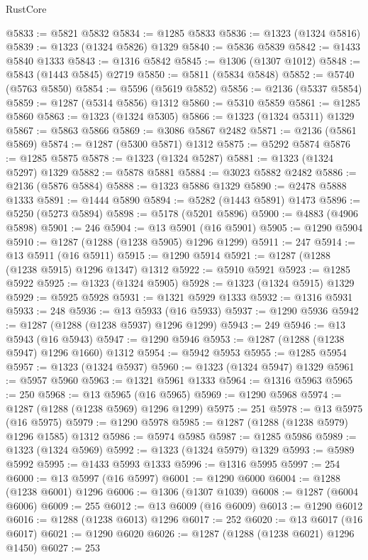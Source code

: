 \begin{lexlean}{RustCore}
\begin{coremodule}
@5833 := @5821 @5832
@5834 := @1285 @5833
@5836 := @1323 (@1324 @5816)
@5839 := @1323 (@1324 @5826) @1329
@5840 := @5836 @5839
@5842 := @1433 @5840 @1333
@5843 := @1316 @5842
@5845 := @1306 (@1307 @1012)
@5848 := @5843 (@1443 @5845) @2719
@5850 := @5811 (@5834 @5848)
@5852 := @5740 (@5763 @5850)
@5854 := @5596 (@5619 @5852)
@5856 := @2136 (@5337 @5854)
@5859 := @1287 (@5314 @5856) @1312
@5860 := @5310 @5859
@5861 := @1285 @5860
@5863 := @1323 (@1324 @5305)
@5866 := @1323 (@1324 @5311) @1329
@5867 := @5863 @5866
@5869 := @3086 @5867 @2482
@5871 := @2136 (@5861 @5869)
@5874 := @1287 (@5300 @5871) @1312
@5875 := @5292 @5874
@5876 := @1285 @5875
@5878 := @1323 (@1324 @5287)
@5881 := @1323 (@1324 @5297) @1329
@5882 := @5878 @5881
@5884 := @3023 @5882 @2482
@5886 := @2136 (@5876 @5884)
@5888 := @1323 @5886 @1329
@5890 := @2478 @5888 @1333
@5891 := @1444 @5890
@5894 := @5282 (@1443 @5891) @1473
@5896 := @5250 (@5273 @5894)
@5898 := @5178 (@5201 @5896)
@5900 := @4883 (@4906 @5898)
@5901 := 246
@5904 := @13 @5901 (@16 @5901)
@5905 := @1290 @5904
@5910 := @1287 (@1288 (@1238 @5905) @1296 @1299)
@5911 := 247
@5914 := @13 @5911 (@16 @5911)
@5915 := @1290 @5914
@5921 := @1287 (@1288 (@1238 @5915) @1296 @1347) @1312
@5922 := @5910 @5921
@5923 := @1285 @5922
@5925 := @1323 (@1324 @5905)
@5928 := @1323 (@1324 @5915) @1329
@5929 := @5925 @5928
@5931 := @1321 @5929 @1333
@5932 := @1316 @5931
@5933 := 248
@5936 := @13 @5933 (@16 @5933)
@5937 := @1290 @5936
@5942 := @1287 (@1288 (@1238 @5937) @1296 @1299)
@5943 := 249
@5946 := @13 @5943 (@16 @5943)
@5947 := @1290 @5946
@5953 := @1287 (@1288 (@1238 @5947) @1296 @1660) @1312
@5954 := @5942 @5953
@5955 := @1285 @5954
@5957 := @1323 (@1324 @5937)
@5960 := @1323 (@1324 @5947) @1329
@5961 := @5957 @5960
@5963 := @1321 @5961 @1333
@5964 := @1316 @5963
@5965 := 250
@5968 := @13 @5965 (@16 @5965)
@5969 := @1290 @5968
@5974 := @1287 (@1288 (@1238 @5969) @1296 @1299)
@5975 := 251
@5978 := @13 @5975 (@16 @5975)
@5979 := @1290 @5978
@5985 := @1287 (@1288 (@1238 @5979) @1296 @1585) @1312
@5986 := @5974 @5985
@5987 := @1285 @5986
@5989 := @1323 (@1324 @5969)
@5992 := @1323 (@1324 @5979) @1329
@5993 := @5989 @5992
@5995 := @1433 @5993 @1333
@5996 := @1316 @5995
@5997 := 254
@6000 := @13 @5997 (@16 @5997)
@6001 := @1290 @6000
@6004 := @1288 (@1238 @6001) @1296
@6006 := @1306 (@1307 @1039)
@6008 := @1287 (@6004 @6006)
@6009 := 255
@6012 := @13 @6009 (@16 @6009)
@6013 := @1290 @6012
@6016 := @1288 (@1238 @6013) @1296
@6017 := 252
@6020 := @13 @6017 (@16 @6017)
@6021 := @1290 @6020
@6026 := @1287 (@1288 (@1238 @6021) @1296 @1450)
@6027 := 253

\end{coremodule}
\end{lexlean}
